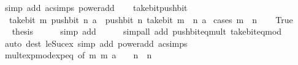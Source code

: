 \begin{isabellebody}
\ {\isacharparenleft}{\kern0pt}simp\ add{\isacharcolon}{\kern0pt}\ ac{\isacharunderscore}{\kern0pt}simps\ power{\isacharunderscore}{\kern0pt}add{\isacharparenright}{\kern0pt}\isanewline
\ \ \isamarkupfalse%
%
\endisatagproof
{\isafoldproof}%
%
\isadelimproof
\isanewline
%
\endisadelimproof
\isanewline
{}\isamarkupfalse%
\ take{\isacharunderscore}{\kern0pt}bit{\isacharunderscore}{\kern0pt}push{\isacharunderscore}{\kern0pt}bit{\isacharcolon}{\kern0pt}\isanewline
\ \ {\isachardoublequoteopen}take{\isacharunderscore}{\kern0pt}bit\ m\ {\isacharparenleft}{\kern0pt}push{\isacharunderscore}{\kern0pt}bit\ n\ a{\isacharparenright}{\kern0pt}\ {\isacharequal}{\kern0pt}\ push{\isacharunderscore}{\kern0pt}bit\ n\ {\isacharparenleft}{\kern0pt}take{\isacharunderscore}{\kern0pt}bit\ {\isacharparenleft}{\kern0pt}m\ {\isacharminus}{\kern0pt}\ n{\isacharparenright}{\kern0pt}\ a{\isacharparenright}{\kern0pt}{\isachardoublequoteclose}\isanewline
%
\isadelimproof
%
\endisadelimproof
%
\isatagproof
{}\isamarkupfalse%
\ {\isacharparenleft}{\kern0pt}cases\ {\isachardoublequoteopen}m\ {\isasymle}\ n{\isachardoublequoteclose}{\isacharparenright}{\kern0pt}\isanewline
\ \ \isamarkupfalse%
\ True\isanewline
\ \ \isamarkupfalse%
\ \isamarkupfalse%
\ {\isacharquery}{\kern0pt}thesis\isanewline
\ \ \ \ \isamarkupfalse%
\ {\isacharparenleft}{\kern0pt}simp\ add{\isacharcolon}{\kern0pt}{\isacharparenright}{\kern0pt}\isanewline
\ \ \ \ \isamarkupfalse%
\ {\isacharparenleft}{\kern0pt}simp{\isacharunderscore}{\kern0pt}all\ add{\isacharcolon}{\kern0pt}\ push{\isacharunderscore}{\kern0pt}bit{\isacharunderscore}{\kern0pt}eq{\isacharunderscore}{\kern0pt}mult\ take{\isacharunderscore}{\kern0pt}bit{\isacharunderscore}{\kern0pt}eq{\isacharunderscore}{\kern0pt}mod{\isacharparenright}{\kern0pt}\isanewline
\ \ \ \ \isamarkupfalse%
\ {\isacharparenleft}{\kern0pt}auto\ dest{\isacharbang}{\kern0pt}{\isacharcolon}{\kern0pt}\ le{\isacharunderscore}{\kern0pt}Suc{\isacharunderscore}{\kern0pt}ex\ simp\ add{\isacharcolon}{\kern0pt}\ power{\isacharunderscore}{\kern0pt}add\ ac{\isacharunderscore}{\kern0pt}simps{\isacharparenright}{\kern0pt}\isanewline
\ \ \ \ \isamarkupfalse%
\ mult{\isacharunderscore}{\kern0pt}exp{\isacharunderscore}{\kern0pt}mod{\isacharunderscore}{\kern0pt}exp{\isacharunderscore}{\kern0pt}eq\ {\isacharbrackleft}{\kern0pt}of\ m\ m\ {\isacartoucheopen}a\ {\isacharasterisk}{\kern0pt}\ {}\ {\isacharcircum}{\kern0pt}\ n{\isacartoucheclose}\ \ n{\isacharbrackright}{\kern0pt}\isanewline

\end{isabellebody}
